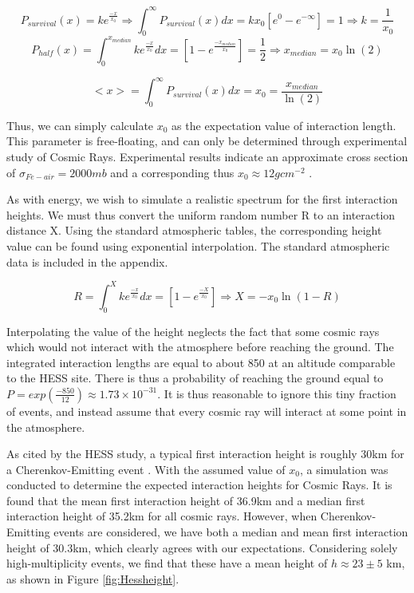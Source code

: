 \documentclass[11pt]{article}
\begin{document}
\[ P_{survival}(x) = k e^{\frac{-x}{x_{0}}} \Longrightarrow \int_{0}^{\infty} P_{survival}(x) dx = k x_{0} [ e^{0} - e ^ {- \infty}] = 1 \Longrightarrow k = \frac{1}{x_{0}}\]
\[P_{half}(x) =\int_{0}^{x_{median}} k e^{\frac{-x}{x_{0}}} dx =[1 -e^{\frac{-x_{median}}{x_{0}}} ]= \frac{1}{2} \Longrightarrow {x_{median}} = x_{0} \ln (2)\]

\[ <x> =  \int_{0}^{\infty} P_{survival}(x) dx = x_{0} = \frac{x_{median}}{\ln (2)} \]

Thus, we can simply calculate $x_{0}$ as the expectation value of interaction length. This parameter is free-floating, and can only be determined through experimental study of Cosmic Rays. Experimental results indicate an approximate cross section of $\sigma_{Fe-air} = 2000mb$ and a corresponding thus $x_{0} \approx 12 g cm^{-2}$ \cite{Montanus2013}. 

As with energy, we wish to simulate a realistic spectrum for the first interaction heights. We must thus convert the uniform random number R to an interaction distance X. Using the standard atmospheric tables, the corresponding height value can be found using exponential interpolation. The standard atmospheric data is included in the appendix.

\[ R = \int_{0}^{X} k e^{\frac{-x}{x_{0}}} dx = [1 -e^{\frac{-X}{x_{0}}}] \Longrightarrow X = -x_{0} \ln (1 - R) \] 

Interpolating the value of the height neglects the fact that some cosmic rays which would not interact with the atmosphere before reaching the ground. The integrated interaction lengths are equal to about 850 at an altitude comparable to the HESS site. There is thus a probability of reaching the ground equal to $P = exp(\frac{-850}{12}) \approx 1.73 \times 10 ^{-31}$. It is thus reasonable to ignore this tiny fraction of events, and instead assume that every cosmic ray will interact at some point in the atmosphere.

As cited by the HESS study, a typical first interaction height is roughly 30km for a Cherenkov-Emitting event \cite{hess07}. With the assumed value of $x_{0}$, a simulation was conducted to determine the expected interaction heights for Cosmic Rays. It is found that the mean first interaction height of 36.9km and a median first interaction height of 35.2km for all cosmic rays. However, when Cherenkov-Emitting events are considered, we have both a median and mean first interaction height of 30.3km, which clearly agrees with our expectations. Considering solely high-multiplicity events, we find that these have a mean height of $h \approx 23 \pm 5$ km, as shown in Figure \ref{fig:Hessheight}.
\end{document}
